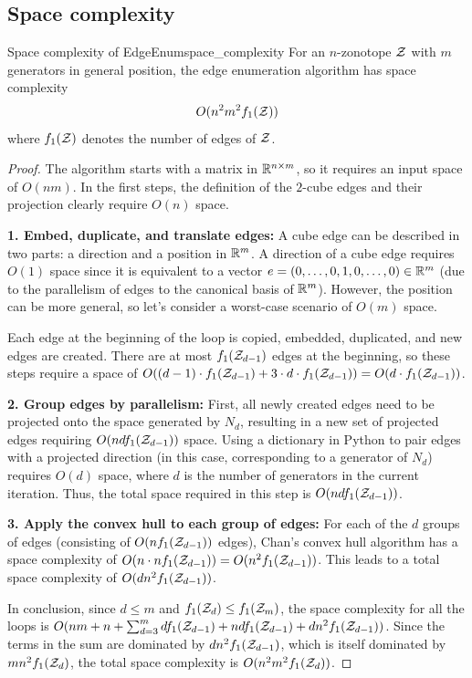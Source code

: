 \subsection{Space complexity}
\begin{theorembox}{Space complexity of EdgeEnum}{space_complexity}
    For an $n$-zonotope $\mathcal{Z}$ with $m$ generators in general position, the edge enumeration algorithm has space complexity 
    \begin{align*}
        O(n^2m^2f_1(\mathcal{Z}))
    \end{align*}
    where $f_1(\mathcal{Z})$ denotes the number of edges of $\mathcal{Z}$.
\end{theorembox}
\begin{proof}
    The algorithm starts with a matrix in $\mathbb{R}^{n\times m}$, so it requires an input space of $O(nm)$. In the first steps, the definition of the $2$-cube edges and their projection clearly require $O(n)$ space.

    \textbf{1. Embed, duplicate, and translate edges:} 
    A cube edge can be described in two parts: a direction and a position in $\mathbb{R}^m$. A direction of a cube edge requires $O(1)$ space since it is equivalent to a vector $e = (0, \dots, 0, 1, 0,\dots, 0) \in \mathbb{R}^m$ (due to the parallelism of edges to the canonical basis of $\mathbb{R}^m$). However, the position can be more general, so let's consider a worst-case scenario of $O(m)$ space.

    Each edge at the beginning of the loop is copied, embedded, duplicated, and new edges are created. There are at most $f_1(\mathcal{Z}_{d-1})$ edges at the beginning, so these steps require a space of $O((d-1)\cdot f_1(\mathcal{Z}_{d-1}) + 3\cdot d\cdot f_1(\mathcal{Z}_{d-1})) = O(d\cdot f_1(\mathcal{Z}_{d-1}))$.

    \textbf{2. Group edges by parallelism:} 
    First, all newly created edges need to be projected onto the space generated by $N_d$, resulting in a new set of projected edges requiring $O(ndf_1(\mathcal{Z}_{d-1}))$ space. Using a dictionary in Python to pair edges with a projected direction (in this case, corresponding to a generator of $N_d$) requires $O(d)$ space, where $d$ is the number of generators in the current iteration. Thus, the total space required in this step is $O(ndf_1(\mathcal{Z}_{d-1}))$.
    
    \textbf{3. Apply the convex hull to each group of edges:} For each of the $d$ groups of edges (consisting of $O(nf_1(\mathcal{Z}_{d-1}))$ edges), Chan's convex hull algorithm has a space complexity of $O(n\cdot nf_1(\mathcal{Z}_{d-1})) = O(n^2 f_1(\mathcal{Z}_{d-1}))$. This leads to a total space complexity of $O(dn^2f_1(\mathcal{Z}_{d-1}))$.

    In conclusion, since $d\leq m$ and $f_1(\mathcal{Z}_d) \leq f_1(\mathcal{Z}_m)$, the space complexity for all the loops is $O(nm + n + \sum_{d=3}^m df_1(\mathcal{Z}_{d-1}) + ndf_1(\mathcal{Z}_{d-1}) + dn^2f_1(\mathcal{Z}_{d-1}))$. Since the terms in the sum are dominated by $dn^2f_1(\mathcal{Z}_{d-1})$, which is itself dominated by $mn^2f_1(\mathcal{Z}_d)$, the total space complexity is $O(n^2 m^2 f_1(\mathcal{Z}_d))$.
\end{proof}

